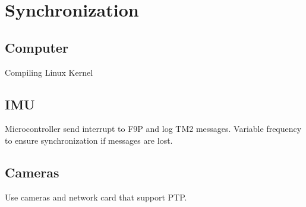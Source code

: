 \section*{Synchronization}

\subsection*{Computer}
Compiling Linux Kernel


\subsection*{IMU}
Microcontroller send interrupt to F9P and log TM2 messages.
Variable frequency to ensure synchronization if messages are lost.

\subsection*{Cameras}
Use cameras and network card that support PTP.
